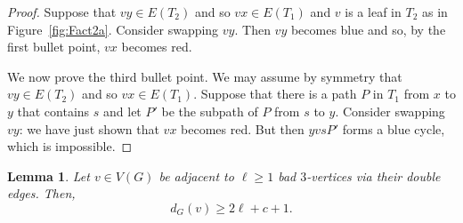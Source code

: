 \documentclass[11pt, reqno, a4paper]{article}
\newtheorem{lemma}{Lemma}[section]
\theoremstyle{definition}
\numberwithin{equation}{section}
\renewcommand{\geq}{\geqslant}
\begin{document}
\begin{proof}
Suppose that \(vy \in E(T_2)\) and so \(vx \in E(T_1)\) and \(v\) is a leaf in \(T_2\) as in Figure~\ref{fig:Fact2a}. Consider swapping \(vy\). Then \(vy\) becomes blue and so, by the first bullet point, \(vx\) becomes red.

We now prove the third bullet point. We may assume by symmetry that \(vy \in E(T_2)\) and so \(vx \in E(T_1)\). Suppose that there is a path \(P\) in \(T_1\) from \(x\) to \(y\) that contains \(s\) and let $P'$ be the subpath of $P$ from $s$ to $y$. Consider swapping $vy$: we have just shown that $vx$ becomes red. But then $yvsP'$ forms a blue cycle, which is impossible.
\end{proof}
\begin{lemma}\label{lem:badvertices}
Let $v\in V(G)$ be adjacent to $\ell\geq 1$ bad $3$-vertices via their double edges.
Then,
\begin{equation*}
d_G(v) \geq 2\ell +c+1.
\end{equation*}
\end{lemma}
\end{document}
